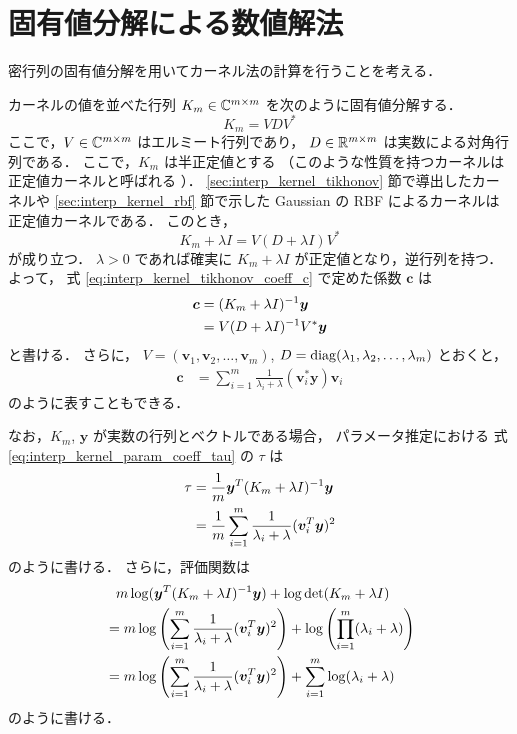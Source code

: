 \section{固有値分解による数値解法}

密行列の固有値分解を用いてカーネル法の計算を行うことを考える．

カーネルの値を並べた行列 $K_m \in \mathbb{C}^{m \times m}$ を次のように固有値分解する．
\begin{equation}
    K_m = V D V^*
\end{equation}
ここで，$V \in \mathbb{C}^{m \times m}$ はエルミート行列であり，
$D \in \mathbb{R}^{m \times m}$ は実数による対角行列である．
ここで，$K_m$ は半正定値とする
（このような性質を持つカーネルは正定値カーネルと呼ばれる \cite{Fukumizu2010}）．
\ref{sec:interp_kernel_tikhonov} 節で導出したカーネルや
\ref{sec:interp_kernel_rbf} 節で示した Gaussian の RBF によるカーネルは
正定値カーネルである．
このとき，
\begin{equation}
    K_m + \lambda I = V (D + \lambda I) V^*
\end{equation}
が成り立つ．
$\lambda > 0$ であれば確実に $K_m + \lambda I$ が正定値となり，逆行列を持つ．
よって，
式 \eqref{eq:interp_kernel_tikhonov_coeff_c} で定めた係数 $\bm{c}$ は
\begin{align}
    \bm{c}
     & = (K_m + \lambda I)^{-1} \bm{y} \notag \\
     & = V (D + \lambda I)^{-1} V^* \bm{y}
\end{align}
と書ける．
さらに，
$V = (\bm{v}_1, \bm{v}_2, \ldots, \bm{v}_m)$,
$D = \operatorname{diag}(\lambda_1, \lambda_2, \ldots, \lambda_m)$
とおくと，
\begin{align}
    \bm{c}
     & = \sum_{i=1}^m \frac{1}{\lambda_i + \lambda} (\bm{v}_i^* \bm{y}) \bm{v}_i
\end{align}
のように表すこともできる．

なお，$K_m$, $\bm{y}$ が実数の行列とベクトルである場合，
パラメータ推定における
式 \eqref{eq:interp_kernel_param_coeff_tau} の $\tau$ は
\begin{align}
    \tau
     & = \frac{1}{m} \bm{y}^T (K_m + \lambda I)^{-1} \bm{y} \notag                    \\
     & = \frac{1}{m} \sum_{i=1}^m \frac{1}{\lambda_i + \lambda} (\bm{v}_i^T \bm{y})^2
\end{align}
のように書ける．
さらに，評価関数は
\begin{align}
     & \hphantom{=}
    m \log(\bm{y}^T (K_m + \lambda I)^{-1} \bm{y})
    + \log{\det(K_m + \lambda I)}
    \notag                                                                                   \\
     & = m \log\left(\sum_{i=1}^m \frac{1}{\lambda_i + \lambda} (\bm{v}_i^T \bm{y})^2\right)
    + \log\left(\prod_{i=1}^m (\lambda_i + \lambda)\right)
    \notag                                                                                   \\
     & = m \log\left(\sum_{i=1}^m \frac{1}{\lambda_i + \lambda} (\bm{v}_i^T \bm{y})^2\right)
    + \sum_{i=1}^m \log(\lambda_i + \lambda)
\end{align}
のように書ける．

